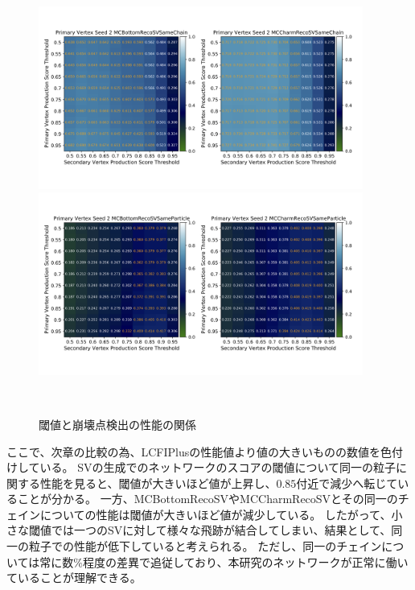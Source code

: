 \begin{figure}[htbp]
   \begin{minipage}{1.0\textwidth}
   \centering
    \includegraphics[trim = 0 140 0 140, width=0.95\textwidth, clip]{Figure/4VertexFinderwithDL/4-2-0-3TrackEfficiencySameChain.png}
   \end{minipage}
   
   \begin{minipage}{1.0\textwidth}
   \centering
    \includegraphics[trim = 0 140 0 140, width=0.95\textwidth, clip]{Figure/4VertexFinderwithDL/4-2-0-3TrackEfficiencySameParticle.png}
   \end{minipage} 
  \caption{閾値と崩壊点検出の性能の関係}
  \label{4-2-0-3TrackEfficiency}
\end{figure}

ここで、次章の比較の為、LCFIPlusの性能値より値の大きいものの数値を色付けしている。
SVの生成でのネットワークのスコアの閾値について同一の粒子に関する性能を見ると、閾値が大きいほど値が上昇し、$0.85$付近で減少へ転じていることが分かる。
一方、MCBottomRecoSVやMCCharmRecoSVとその同一のチェインについての性能は閾値が大きいほど値が減少している。
したがって、小さな閾値では一つのSVに対して様々な飛跡が結合してしまい、結果として、同一の粒子での性能が低下していると考えられる。
ただし、同一のチェインについては常に数\%程度の差異で追従しており、本研究のネットワークが正常に働いていることが理解できる。

